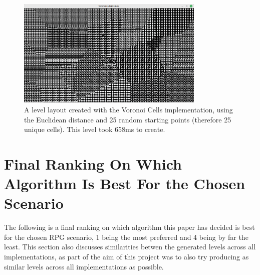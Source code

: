 \begin{figure}[H]
    \centering
    \includegraphics[width=0.8\textwidth]{Images/voronoi-25-658ms.png}
    \caption{A level layout created with the Voronoi Cells implementation, using the Euclidean distance and 25 random starting points (therefore 25 unique cells). This level took 658ms to create.}
    \label{fig:voronoilevel2}
\end{figure}

\section{Final Ranking On Which Algorithm Is Best For the Chosen Scenario}

The following is a final ranking on which algorithm this paper has decided is best for the chosen RPG scenario, 1 being the most preferred and 4 being by far the least. This section also discusses similarities betwen the generated levels across all implementations, as part of the aim of this project was to also try producing as similar levels across all implementations as possible.

